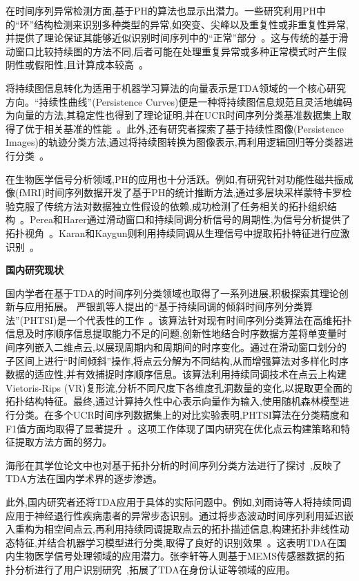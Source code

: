 在时间序列异常检测方面,基于PH的算法也显示出潜力。一些研究利用PH中的“环”结构检测来识别多种类型的异常\cite{boispersistent},如突变、尖峰以及重复性或非重复性异常,并提供了理论保证其能够近似识别时间序列中的“正常”部分~。这与传统的基于滑动窗口比较持续图的方法不同,后者可能在处理重复异常或多种正常模式时产生假阴性或假阳性,且计算成本较高~。

将持续图信息转化为适用于机器学习算法的向量表示是TDA领域的一个核心研究方向。“持续性曲线”(Persistence Curves)便是一种将持续图信息规范且灵活地编码为向量的方法,其稳定性也得到了理论证明\cite{chung2020persistent},并在UCR时间序列分类基准数据集上取得了优于相关基准的性能~。此外,还有研究者探索了基于持续性图像(Persistence Images)的轨迹分类方法,通过将持续图转换为图像表示,再利用逻辑回归等分类器进行分类~。\cite{adams2017persistence}

在生物医学信号分析领域,PH的应用也十分活跃。例如,有研究针对功能性磁共振成像(fMRI)时间序列数据开发了基于PH的统计推断方法,通过多层块采样蒙特卡罗检验克服了传统方法对数据独立性假设的依赖,成功检测了任务相关的拓扑组织结构~。\cite{abdallah2023statistical}Perea和Harer\cite{perea2015sliding}通过滑动窗口和持续同调分析信号的周期性,为信号分析提供了拓扑视角~。Karan和Kaygun\cite{3}则利用持续同调从生理信号中提取拓扑特征进行应激识别~。

\textbf{国内研究现状}

国内学者在基于TDA的时间序列分类领域也取得了一系列进展,积极探索其理论创新与应用拓展。
严银凯等人\cite{JSJC202406009}提出的“基于持续同调的倾斜时间序列分类算法”(PHTSI)是一个代表性的工作~。该算法针对现有时间序列分类算法在高维拓扑信息及时序顺序信息提取能力不足的问题,创新性地结合时序数据方差将单变量时间序列嵌入二维点云,以展现周期内和周期间的时序变化。通过在滑动窗口划分的子区间上进行“时间倾斜”操作,将点云分解为不同结构,从而增强算法对多样化时序数据的适应性,并有效捕捉时序顺序信息。该算法利用持续同调技术在点云上构建Vietoris-Rips (VR)复形流,分析不同尺度下各维度孔洞数量的变化,以提取更全面的拓扑结构特征。最终,通过计算持久性中心表示向量作为输入,使用随机森林模型进行分类。在多个UCR时间序列数据集上的对比实验表明,PHTSI算法在分类精度和F1值方面均取得了显著提升~。这项工作体现了国内研究在优化点云构建策略和特征提取方法方面的努力。

海彤\cite{1021736289.nh}在其学位论文中也对基于拓扑分析的时间序列分类方法进行了探讨~,反映了TDA方法在国内学术界的逐步渗透。

此外,国内研究者还将TDA应用于具体的实际问题中。例如,刘雨诗等人\cite{刘语诗2022基于拓扑非线性动态建模的神经退行性疾病异常步态识别}将持续同调应用于神经退行性疾病患者的异常步态识别。通过将步态波动时间序列利用延迟嵌入重构为相空间点云,再利用持续同调提取点云的拓扑描述信息,构建拓扑非线性动态特征,并结合机器学习模型进行分类,取得了良好的识别效果~。这表明TDA在国内生物医学信号处理领域的应用潜力。张李轩等人\cite{张李轩2021基于}则基于MEMS传感器数据的拓扑分析进行了用户识别研究~,拓展了TDA在身份认证等领域的应用。

